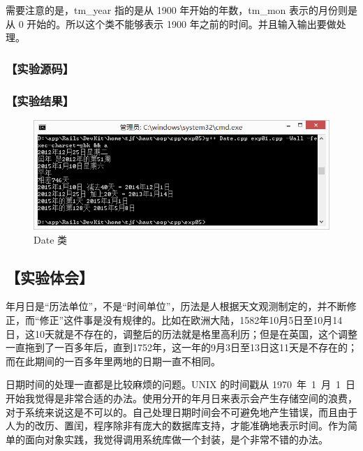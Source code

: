 需要注意的是，tm\_year 指的是从 1900 年开始的年数，tm\_mon 表示的月份则是从 0 开始的。所以这个类不能够表示 1900 年之前的时间。并且输入输出要做处理。

\subsubsection*{【实验源码】}
{\linespread{1}}
{\linespread{1}}
{\linespread{1}}
\subsubsection*{【实验结果】}
\begin{figure}[htp]
\centering
\includegraphics[width=\textwidth]{exp05/exp01.png}
\caption{\label{out05_01}Date 类}
\end{figure}
\subsection*{【实验体会】}

年月日是“历法单位”，不是“时间单位”，历法是人根据天文观测制定的，并不断修正，而“修正”这件事是没有规律的。比如在欧洲大陆，1582年10月5日至10月14日，这10天就是不存在的，调整后的历法就是格里高利历；但是在英国，这个调整一直拖到了一百多年后，直到1752年，这一年的9月3日至13日这11天是不存在的；而在此期间的一百多年里两地的日期一直不相同。

日期时间的处理一直都是比较麻烦的问题。UNIX 的时间戳从 1970~年~1~月~1~日 开始我觉得是非常合适的办法。使用分开的年月日来表示会产生存储空间的浪费，对于系统来说这是不可以的。自己处理日期时间会不可避免地产生错误，而且由于人为的改历、置闰，程序除非有庞大的数据库支持，才能准确地表示时间。作为简单的面向对象实践，我觉得调用系统库做一个封装，是个非常不错的办法。
